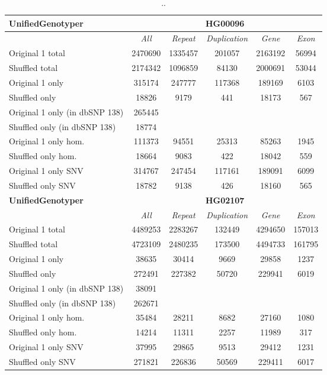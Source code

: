 \begin{table}[htb]
\caption{ .. }
\begin{center}
\begin{tabular}{|l|c||c|c|c|c|}
\hline
{\bf UnifiedGenotyper} & \multicolumn{5}{|c|}{\bf HG00096} \\
\hline
\cline{2-6}
{\bf} & {\it All} & {\it Repeat} & {\it Duplication} & {\it Gene} & {\it Exon} \\
\hline
Original 1 total & 2470690 & 1335457 & 201057 & 2163192 & 56994\\ 
\hline
Shuffled total & 2174342 & 1096859 & 84130 & 2000691 & 53044\\ 
\hline
Original 1 only & 315174 & 247777 & 117368 & 189169 & 6103\\ 
\hline
Shuffled only & 18826 & 9179 & 441 & 18173 & 567\\ 
\hline
Original 1 only (in dbSNP 138) & 265445 &  &  &  & \\ 
\hline
Shuffled only (in dbSNP 138) & 18774 &  &  &  & \\ 
\hline
Original 1 only hom. & 111373 & 94551 & 25313 & 85263 & 1945\\ 
\hline
Shuffled only hom. & 18664 & 9083 & 422 & 18042 & 559\\ 
\hline
Original 1 only SNV & 314767 & 247454 & 117161 & 189091 & 6099\\ 
\hline
Shuffled only SNV & 18782 & 9138 & 426 & 18160 & 565\\ 
\hline
\hline
{\bf UnifiedGenotyper} & \multicolumn{5}{|c|}{\bf HG02107} \\
\hline
\cline{2-6}
{\bf} & {\it All} & {\it Repeat} & {\it Duplication} & {\it Gene} & {\it Exon} \\
\hline
Original 1 total & 4489253 & 2283267 & 132449 & 4294650 & 157013\\ 
\hline
Shuffled total & 4723109 & 2480235 & 173500 & 4494733 & 161795\\ 
\hline
Original 1 only & 38635 & 30414 & 9669 & 29858 & 1237\\ 
\hline
Shuffled only & 272491 & 227382 & 50720 & 229941 & 6019\\ 
\hline
Original 1 only (in dbSNP 138) & 38091 &  &  &  & \\ 
\hline
Shuffled only (in dbSNP 138) & 262671 &  &  &  & \\ 
\hline
Original 1 only hom. & 35484 & 28211 & 8682 & 27160 & 1080\\ 
\hline
Shuffled only hom. & 14214 & 11311 & 2257 & 11989 & 317\\ 
\hline
Original 1 only SNV & 37995 & 29865 & 9513 & 29412 & 1231\\ 
\hline
Shuffled only SNV & 271821 & 226836 & 50569 & 229411 & 6017\\ 
\hline
\end{tabular}
\end{center}
\label{tab:orig-vs-shuf-ug}
\end{table}

